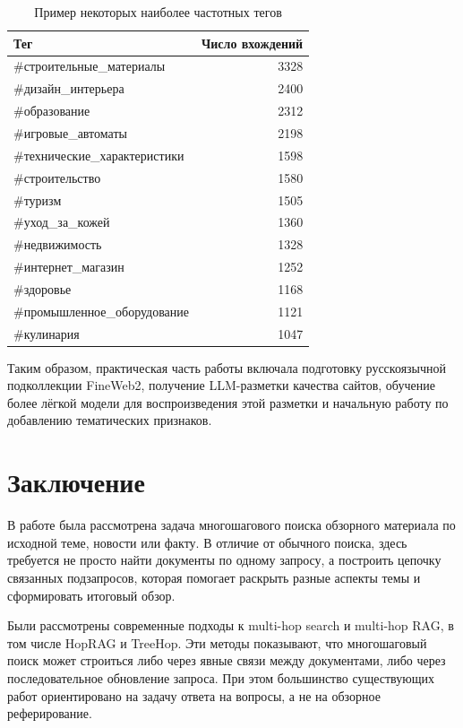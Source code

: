 \documentclass[oneside,senior,etd]{BYUPhys}
\begin{document}
\begin{table}[h]
    \centering
    \begin{tabular}{lr}
        \toprule
        \textbf{Тег} & \textbf{Число вхождений} \\
        \midrule
        \#строительные\_материалы & 3328 \\
        \#дизайн\_интерьера & 2400 \\
        \#образование & 2312 \\
        \#игровые\_автоматы & 2198 \\
        \#технические\_характеристики & 1598 \\
        \#строительство & 1580 \\
        \#туризм & 1505 \\
        \#уход\_за\_кожей & 1360 \\
        \#недвижимость & 1328 \\
        \#интернет\_магазин & 1252 \\
        \#здоровье & 1168 \\
        \#промышленное\_оборудование & 1121 \\
        \#кулинария & 1047 \\
        \bottomrule
    \end{tabular}
    \caption{Пример некоторых наиболее частотных тегов}
    \label{tab:frequent_tags}
\end{table}


Таким образом, практическая часть работы включала подготовку русскоязычной подколлекции FineWeb2, 
получение LLM-разметки качества сайтов, обучение более лёгкой модели для воспроизведения этой разметки 
и начальную работу по добавлению тематических признаков.

\section{Заключение}

В работе была рассмотрена задача многошагового поиска обзорного материала по исходной теме, новости или факту. 
В отличие от обычного поиска, здесь требуется не просто найти документы по одному запросу, 
а построить цепочку связанных подзапросов, которая помогает раскрыть разные аспекты темы и сформировать итоговый обзор.

Были рассмотрены современные подходы к multi-hop search и multi-hop RAG, в том числе HopRAG и TreeHop. 
Эти методы показывают, что многошаговый поиск может строиться либо через явные связи между документами, 
либо через последовательное обновление запроса. При этом большинство существующих работ ориентировано на задачу ответа на вопросы, 
а не на обзорное реферирование.
\end{document}

